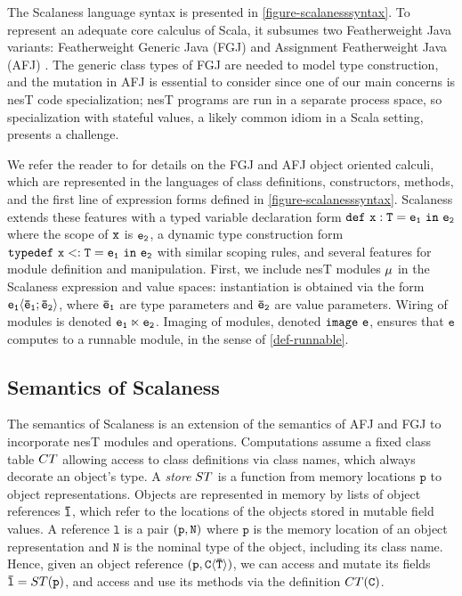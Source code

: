 \scalanesssyntaxfig The Scalaness language syntax is presented in
\autoref{figure-scalanesssyntax}. To represent an adequate core
calculus of Scala, it subsumes two Featherweight Java variants:
Featherweight Generic Java (FGJ) \cite{FJ} and Assignment Featherweight Java
(AFJ) \cite{AFJ}. The generic class types of FGJ are needed to model
type construction, and the mutation in AFJ is essential to consider
since one of our main concerns is nesT code specialization; nesT
programs are run in a separate process space, so specialization with
stateful values, a likely common idiom in a Scala setting, presents a
challenge.

We refer the reader to \cite{FJ,AFJ} for details on the FGJ and AFJ
object oriented calculi, which are represented in the languages of
class definitions, constructors, methods, and the first line of expression
forms defined in \autoref{figure-scalanesssyntax}. Scalaness extends
these features with a typed variable declaration form
$\jdef{x}{T}{e_1}{e_2}$ where the scope of $\tt{x}$ is $\tt{e_2}$, a
dynamic type construction form $\jtlet{x}{T}{e_1}{e_2}$ with similar
scoping rules, and several features for module definition and
manipulation. First, we include nesT modules $\jmodval$ in the
Scalaness expression and value spaces: instantiation is
obtained via the form $\jinst{e_1}{\ttvec{e}_1; \ttvec{e}_2}$, where
$\ttvec{e}_\texttt{1}$ are type parameters and $\ttvec{e}_\texttt{2}$ are
value parameters. Wiring of modules is denoted
$\jwire{\tt{e_1}}{\tt{e_2}}$.  Imaging of modules, denoted
$\jimage{\texttt{e}}$, ensures that $\texttt{e}$ computes to a runnable
module, in the sense of \autoref{def-runnable}.

\subsection{Semantics of Scalaness}

The semantics of Scalaness is an extension of the semantics of AFJ and
FGJ to incorporate nesT modules and operations.  Computations assume a
fixed class table $\CT$ allowing access to class definitions via class
names, which always decorate an object's type. A \emph{store}
$\jstore$ is a function from memory locations $\texttt{p}$ to object
representations.  Objects are represented in memory by lists of object
references $\ttvec{l}$, which refer to the locations of the objects
stored in mutable field values.  A reference $\texttt{l}$ is a pair
$\jref{\texttt{p}}{N}$ where $\texttt{p}$ is the memory location of an object
representation and $\texttt{N}$ is the nominal type of the object,
including its class name. Hence, given an object reference
$\jref{\texttt{p}}{\jinst{C}{\ttvec{T}}}$, we can access and mutate its
fields $\ttvec{l} = \jstore(\texttt{p})$, and access and use its methods
via the definition $\CT(\texttt{C})$.

